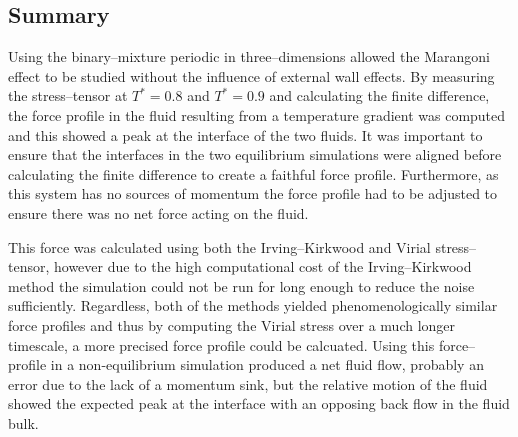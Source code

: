 \subsection{Summary}
Using the binary--mixture periodic in three--dimensions allowed the Marangoni effect to be studied without the influence of external wall effects.
By measuring the stress--tensor at $T^{*}=0.8$ and $T^{*}=0.9$ and calculating the finite difference, the force profile in the fluid resulting from a temperature gradient was computed and this showed a peak at the interface of the two fluids.
It was important to ensure that the interfaces in the two equilibrium simulations were aligned before calculating the finite difference to create a faithful force profile.
Furthermore, as this system has no sources of momentum the force profile had to be adjusted to ensure there was no net force acting on the fluid.

This force was calculated using both the Irving--Kirkwood and Virial stress--tensor, however due to the high computational cost of the Irving--Kirkwood method the simulation could not be run for long enough to reduce the noise sufficiently.
Regardless, both of the methods yielded phenomenologically similar force profiles and thus by computing the Virial stress over a much longer timescale, a more precised force profile could be calcuated.
Using this force--profile in a non-equilibrium simulation produced a net fluid flow, probably an error due to the lack of a momentum sink, but the relative motion of the fluid showed the expected peak at the interface with an opposing back flow in the fluid bulk.
